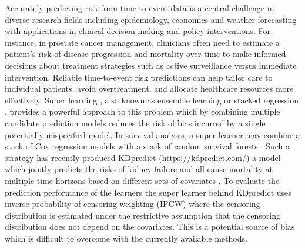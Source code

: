 \documentclass[a4paper,danish]{article}
\theoremstyle{plain} %
\numberwithin{theorem}{section}
\theoremstyle{definition} %
\theoremstyle{remark}
\newcommand{\1}{\mathds{1}}
\begin{document}
Accurately predicting risk from time-to-event data is a central
challenge in diverse research fields including epidemiology, economics
and weather forecasting with applications in clinical
decision making and policy interventions. For instance, in prostate
cancer management, clinicians often need to estimate a patient’s risk
of disease progression and mortality over time to make informed
decisions about treatment strategies such as active surveillance
versus immediate intervention. Reliable time-to-event risk predictions
can help tailor care to individual patients, avoid overtreatment, and
allocate healthcare resources more effectively. Super learning
\citep{van2007super}, also known as ensemble learning or stacked
regression \citep{wolpert1992stacked,breiman1996stacked}, provides a
powerful approach to this problem which by combining multiple
candidate prediction models reduces the risk of bias incurred by a
single potentially mispecified model. In survival analysis, a super
learner may combine a stack of Cox regression models with a stack of
random survival forests \citep[][Section 8.4]{gerds2021medical}. Such
a strategy has recently produced KDpredict
(\url{https://kdpredict.com/}) a model which jointly predicts the
risks of kidney failure and all-cause mortality at multiple time
horizons based on different sets of covariates
\citep{liu2024predicting}. To evaluate the prediction performance of
the learners the super learner behind KDpredict uses inverse
probability of censoring weighting (IPCW) where the censoring
distribution is estimated under the restrictive assumption that the
censoring distribution does not depend on the covariates. This is a
potential source of bias which is difficult to overcome with the
currently available methods.
\end{document}
